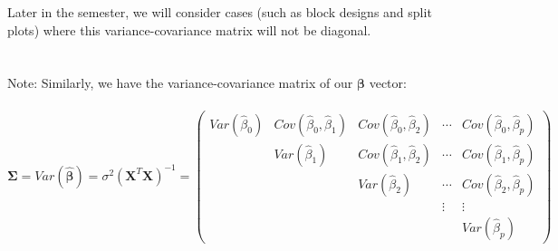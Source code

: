 Later in the semester, we will consider cases (such as block designs and split plots) where this variance-covariance matrix will not be diagonal.\\~\\~\\

Note: Similarly, we have the variance-covariance matrix of our $\boldsymbol{\beta}$ vector:\\~\\

$$\boldsymbol{\Sigma}=Var(\boldsymbol{\hat{\beta}})=\sigma^2\left(\textbf{X}^{T}\textbf{X}\right)^{-1}=\left(\begin{array}{ccccc} Var(\hat{\beta}_0) & Cov(\hat{\beta}_0,\hat{\beta}_1) & Cov(\hat{\beta}_0,\hat{\beta}_2) & \cdots & Cov(\hat{\beta}_0,\hat{\beta}_p)\\
 & Var(\hat{\beta}_1) & Cov(\hat{\beta}_1,\hat{\beta}_2) & \cdots & Cov(\hat{\beta}_1,\hat{\beta}_p)\\
 & & Var(\hat{\beta}_2) & \cdots & Cov(\hat{\beta}_2,\hat{\beta}_p)\\
 &  &  & \vdots & \vdots\\
 & & & & Var(\hat{\beta}_p)\end{array}\right)$$

\newpage

